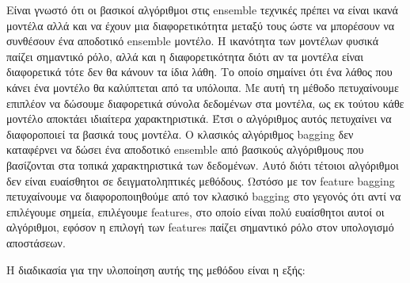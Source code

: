 \documentclass[a4paper,12pt]{report}
\theoremstyle{definitionNODot}
\begin{document}
	Είναι γνωστό ότι οι βασικοί αλγόριθμοι στις ensemble τεχνικές πρέπει να είναι ικανά μοντέλα αλλά και να έχουν μια διαφορετικότητα μεταξύ τους ώστε να μπορέσουν να συνθέσουν ένα αποδοτικό ensemble μοντέλο. Η ικανότητα των μοντέλων φυσικά παίζει σημαντικό ρόλο, αλλά και η διαφορετικότητα διότι αν τα μοντέλα είναι διαφορετικά τότε δεν θα κάνουν τα ίδια λάθη. Το οποίο σημαίνει ότι ένα λάθος που κάνει ένα μοντέλο θα καλύπτεται από τα υπόλοιπα. Με αυτή τη μέθοδο πετυχαίνουμε επιπλέον να δώσουμε διαφορετικά σύνολα δεδομένων στα μοντέλα, ως εκ τούτου κάθε μοντέλο αποκτάει ιδιαίτερα χαρακτηριστικά. Έτσι ο αλγόριθμος αυτός πετυχαίνει να διαφοροποιεί τα βασικά τους μοντέλα. Ο κλασικός αλγόριθμος bagging δεν καταφέρνει να δώσει ένα αποδοτικό ensemble από βασικούς αλγόριθμους που βασίζονται στα τοπικά χαρακτηριστικά των δεδομένων. Αυτό διότι τέτοιοι αλγόριθμοι δεν είναι ευαίσθητοι σε δειγματοληπτικές μεθόδους. Ωστόσο με τον feature bagging πετυχαίνουμε να διαφοροποιηθούμε από τον κλασικό bagging στο γεγονός ότι αντί να επιλέγουμε σημεία, επιλέγουμε features, στο οποίο είναι πολύ ευαίσθητοι αυτοί οι αλγόριθμοι, εφόσον η επιλογή των features παίζει σημαντικό ρόλο στον υπολογισμό αποστάσεων.
	
	Η διαδικασία για την υλοποίηση αυτής της μεθόδου είναι η εξής: 
	
\end{document}
